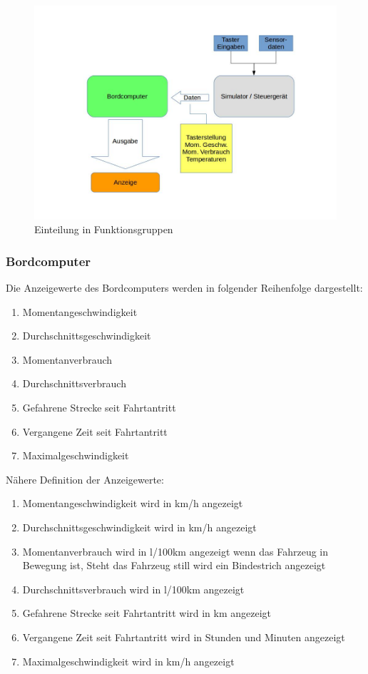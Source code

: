 \documentclass[a4paper,12pt]{article}
\begin{document}
\begin{figure}[!ht]

\begin{center}
\includegraphics[scale=0.55]{Funktionsblock.jpg}
\caption{Einteilung in Funktionsgruppen}
\end{center}

\end{figure}

\subsubsection{Bordcomputer}

Die Anzeigewerte des Bordcomputers werden in folgender Reihenfolge dargestellt:
\begin{enumerate}
	\item Momentangeschwindigkeit
	\item Durchschnittsgeschwindigkeit
	\item Momentanverbrauch
	\item Durchschnittsverbrauch
	\item Gefahrene Strecke seit Fahrtantritt
	\item Vergangene Zeit seit Fahrtantritt
	\item Maximalgeschwindigkeit
\end{enumerate}

Nähere Definition der Anzeigewerte:
\begin{enumerate}
	\item Momentangeschwindigkeit 
			wird in km/h angezeigt
	\item Durchschnittsgeschwindigkeit
			wird in km/h angezeigt
	\item Momentanverbrauch
			wird in l/100km angezeigt wenn das Fahrzeug in Bewegung ist,
			Steht das Fahrzeug still wird ein Bindestrich angezeigt
	\item Durchschnittsverbrauch
			wird in l/100km angezeigt
	\item Gefahrene Strecke seit Fahrtantritt
			wird in km angezeigt
	\item Vergangene Zeit seit Fahrtantritt
			wird in Stunden und Minuten angezeigt
	\item Maximalgeschwindigkeit
			wird in km/h angezeigt
\end{enumerate}
\end{document}
